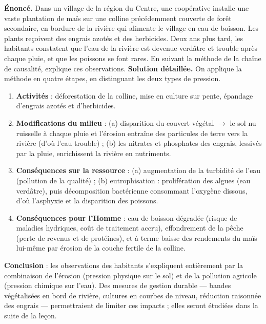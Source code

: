 \documentclass[11pt]{article}
\begin{document}
\begin{exoresolu}
\textbf{Énoncé.} Dans un village de la région du Centre, une coopérative installe une vaste plantation de maïs sur une colline précédemment couverte de forêt secondaire, en bordure de la rivière qui alimente le village en eau de boisson. Les plants reçoivent des engrais azotés et des herbicides. Deux ans plus tard, les habitants constatent que l'eau de la rivière est devenue verdâtre et trouble après chaque pluie, et que les poissons se font rares. En suivant la méthode de la chaîne de causalité, explique ces observations.
\tcblower
\textbf{Solution détaillée.} On applique la méthode en quatre étapes, en distinguant les deux types de pression.
\begin{enumerate}
\item \textbf{Activités} : déforestation de la colline, mise en culture sur pente, épandage d'engrais azotés et d'herbicides.
\item \textbf{Modifications du milieu} : (a) disparition du couvert végétal $\rightarrow$ le sol nu ruisselle à chaque pluie et l'érosion entraîne des particules de terre vers la rivière (d'où l'eau trouble) ; (b) les nitrates et phosphates des engrais, lessivés par la pluie, enrichissent la rivière en nutriments.
\item \textbf{Conséquences sur la ressource} : (a) augmentation de la turbidité de l'eau (pollution de la qualité) ; (b) eutrophisation : prolifération des algues (eau verdâtre), puis décomposition bactérienne consommant l'oxygène dissous, d'où l'asphyxie et la disparition des poissons.
\item \textbf{Conséquences pour l'Homme} : eau de boisson dégradée (risque de maladies hydriques, coût de traitement accru), effondrement de la pêche (perte de revenus et de protéines), et à terme baisse des rendements du maïs lui-même par érosion de la couche fertile de la colline.
\end{enumerate}
\textbf{Conclusion} : les observations des habitants s'expliquent entièrement par la combinaison de l'érosion (pression physique sur le sol) et de la pollution agricole (pression chimique sur l'eau). Des mesures de gestion durable — bandes végétalisées en bord de rivière, cultures en courbes de niveau, réduction raisonnée des engrais — permettraient de limiter ces impacts ; elles seront étudiées dans la suite de la leçon.
\end{exoresolu}
\end{document}
